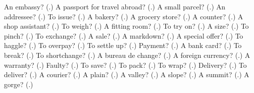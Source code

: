 \begin{tcolorbox}[breakable,colback=teal!4,colframe=teal!35!black,title={Before you move on}]
An embassy? (\textbf{}.) A passport for travel abroad? (\textbf{}.) A small parcel? (\textbf{}.) An addressee? (\textbf{}.) To issue? (\textbf{}.) A bakery? (\textbf{}.) A grocery store? (\textbf{}.) A counter? (\textbf{}.) A shop assistant? (\textbf{}.) To weigh? (\textbf{}.) A fitting room? (\textbf{}.) To try on? (\textbf{}.) A size? (\textbf{}.) To pinch? (\textbf{}.) To exchange? (\textbf{}.) A sale? (\textbf{}.) A markdown? (\textbf{}.) A special offer? (\textbf{}.) To haggle? (\textbf{}.) To overpay? (\textbf{}.) To settle up? (\textbf{}.) Payment? (\textbf{}.) A bank card? (\textbf{}.) To break? (\textbf{}.) To shortchange? (\textbf{}.) A bureau de change? (\textbf{}.) A foreign currency? (\textbf{}.) A warranty? (\textbf{}.) Faulty? (\textbf{}.) To save? (\textbf{}.) To pack? (\textbf{}.) To wrap? (\textbf{}.) Delivery? (\textbf{}.) To deliver? (\textbf{}.) A courier? (\textbf{}.) A plain? (\textbf{}.) A valley? (\textbf{}.) A slope? (\textbf{}.) A summit? (\textbf{}.) A gorge? (\textbf{}.)
\end{tcolorbox}
